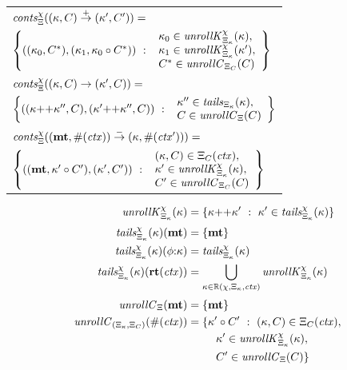 \begin{center}
  \begin{tabular}{l}
    $\mathit{conts}_\Xi^\chi((\kappa,C) \overset{+}{\to} (\kappa',C')) =$ \\
    \quad$\left\{ ((\kappa_0,C^*),(\kappa_1,\kappa_0\circ C^*))\ :\ 
      \begin{array}{l}
        \kappa_0 \in \mathit{unrollK}^{\chi}_{\Xi_\kappa}(\kappa), \\
        \kappa_1 \in \mathit{unrollK}^{\chi}_{\Xi_\kappa}(\kappa'), \\
        C^* \in \mathit{unrollC}_{\Xi_C}(C)
      \end{array}\right\}$
    \\
%
    $\mathit{conts}_\Xi^\chi((\kappa,C) \to (\kappa',C)) =$ \\
    \quad$\left\{ ((\kappa {\tt ++} \kappa'',C), (\kappa' {\tt ++} \kappa'', C))\ :\ \begin{array}{l}
        \kappa'' \in \mathit{tails}_{\Xi_\kappa}(\kappa), \\
        C \in \mathit{unrollC}_{\Xi}(C)
      \end{array}\right\}$
    \\
%
    $\mathit{conts}_\Xi^\chi((\mathbf{mt},\#(\mathit{ctx})) \overset{-}{\to} (\kappa,\#(\mathit{ctx}'))) =$ \\
    \quad$\left\{ ((\mathbf{mt},\kappa'\circ C'),(\kappa',C'))\ :\ 
    \begin{array}{l}
      (\kappa,C) \in \Xi_C(\mathit{ctx}), \\
      \kappa' \in \mathit{unrollK}^{\chi}_{\Xi_\kappa}(\kappa), \\
      C' \in \mathit{unrollC}_{\Xi_C}(C)
    \end{array}\right\}$
  \end{tabular}
\end{center}

\begin{align*}
  \unrollK{\mmktab}{\mktab_\mkont}{\mkont} &= \setbuild{\append{\mkont}{\mkont'}}{\mkont' \in \tailscont{\mktab_\mkont}{\mmktab}{\mkont}}
\\[2pt]
  \tailscont{\mktab_\mkont}{\mmktab}{\mkont}(\kmt) &= \set{\kmt} \\
  \tailscont{\mktab_\mkont}{\mmktab}{\mkont}(\kcons{\mkframe}{\mkont}) &= \tailscont{\mktab_\mkont}{\mmktab}{\mkont} \\
  \tailscont{\mktab_\mkont}{\mmktab}{\mkont}(\krt{\mctx}) &= \bigcup\limits_{\mkont \in \returns(\mmktab,\mktab_\mkont,\mctx)}{\unrollK{\mmktab}{\mktab_\mkont}{\mkont}}
\\[2pt]
  \unrollC{\mktab}{\kmt} &= \set{\kmt} \\
  \unrollC{(\mktab_\mkont,\mktab_\mmkont)}{\kprompt{\mctx}} &=
    \setbuild{\mkapp{\mkont'}{\mmkont'}}{(\mkont,\mmkont) \in \mktab_\mmkont(\mctx),
      \\&\phantom{= \{}\quad \mkont' \in \unrollK{\mmktab}{\mktab_\mkont}{\mkont},
      \\&\phantom{= \{}\quad \mmkont' \in \unrollC{\mktab}{\mmkont}}
\end{align*}


